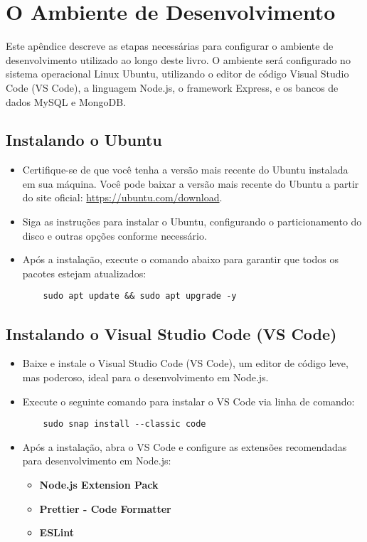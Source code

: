 \chapter{O Ambiente de Desenvolvimento}

Este apêndice descreve as etapas necessárias para configurar o ambiente de desenvolvimento utilizado ao longo deste livro. O ambiente será configurado no sistema operacional Linux Ubuntu, utilizando o editor de código Visual Studio Code (VS Code), a linguagem Node.js, o framework Express, e os bancos de dados MySQL e MongoDB.

\section{Instalando o Ubuntu}
\begin{itemize}
    \item Certifique-se de que você tenha a versão mais recente do Ubuntu instalada em sua máquina. Você pode baixar a versão mais recente do Ubuntu a partir do site oficial: \url{https://ubuntu.com/download}.
    \item Siga as instruções para instalar o Ubuntu, configurando o particionamento do disco e outras opções conforme necessário.
    \item Após a instalação, execute o comando abaixo para garantir que todos os pacotes estejam atualizados:
    \begin{verbatim}
    sudo apt update && sudo apt upgrade -y
    \end{verbatim}
\end{itemize}

\section{Instalando o Visual Studio Code (VS Code)}
\begin{itemize}
    \item Baixe e instale o Visual Studio Code (VS Code), um editor de código leve, mas poderoso, ideal para o desenvolvimento em Node.js.
    \item Execute o seguinte comando para instalar o VS Code via linha de comando:
    \begin{verbatim}
    sudo snap install --classic code
    \end{verbatim}
    \item Após a instalação, abra o VS Code e configure as extensões recomendadas para desenvolvimento em Node.js:
    \begin{itemize}
        \item \textbf{Node.js Extension Pack}
        \item \textbf{Prettier - Code Formatter}
        \item \textbf{ESLint}
    \end{itemize}
\end{itemize}

